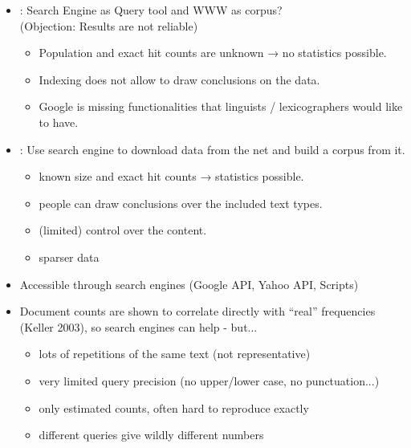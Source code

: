 \documentclass[a4paper,landscape,headrule,footrule,xetex]{foils}
\begin{document}


\maketitle






\begin{itemize}
\item {}: Search Engine as Query tool and WWW as corpus?
\\  (Objection: Results are not reliable)
\begin{itemize}
\item Population and exact hit counts are unknown → no statistics
possible.
\item Indexing does not allow to draw conclusions on the data.
\item[\Bad] Google is missing functionalities that linguists /
lexicographers would like to have.
\end{itemize}
\item {}: Use search engine to download data from the
net and build a corpus from it.
\begin{itemize}
\item known size and exact hit counts → statistics possible.
\item people can draw conclusions over the included text types.
\item (limited) control over the content.
\item[\Bad] sparser data
\end{itemize}
\end{itemize}

\begin{itemize}
\item Accessible through search engines (Google API, Yahoo API, Scripts)

\item Document counts are shown to correlate directly with ``real''
  frequencies (Keller 2003), so search engines can help - but...
  \begin{itemize}
  \item lots of repetitions of the same text (not representative)
  \item very limited query precision (no upper/lower case, no punctuation...)
  \item only estimated counts, often hard to reproduce exactly
  \item different queries give wildly different numbers
  \end{itemize}
\end{itemize}
\end{document}
